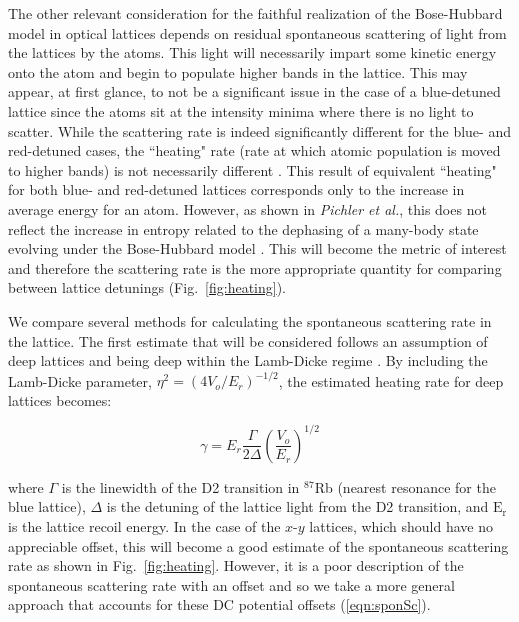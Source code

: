 
The other relevant consideration for the faithful realization of the Bose-Hubbard model in optical lattices depends on residual spontaneous scattering of light from the lattices by the atoms. This light will necessarily impart some kinetic energy onto the atom and begin to populate higher bands in the lattice. This may appear, at first glance, to not be a significant issue in the case of a blue-detuned lattice since the atoms sit at the intensity minima where there is no light to scatter. While the scattering rate is indeed significantly different for the blue- and red-detuned cases, the ``heating" rate (rate at which atomic population is moved to higher bands) is not necessarily different \cite{Pichler2010}. This result of equivalent ``heating" for both blue- and red-detuned lattices corresponds only to the increase in average energy for an atom. However, as shown in \emph{Pichler et al.}, this does not reflect the increase in entropy related to the dephasing of a many-body state evolving under the Bose-Hubbard model \cite{Pichler2010}. This will become the metric of interest and therefore the scattering rate is the more appropriate quantity for comparing between lattice detunings (Fig.~\ref{fig:heating}).

We compare several methods for calculating the spontaneous scattering rate in the lattice. The first estimate that will be considered follows an assumption of deep lattices and being deep within the Lamb-Dicke regime \cite{Grimm2000, Pichler2010}. By including the Lamb-Dicke parameter, $\eta^2=(4V_o/E_r)^{-1/2}$, the estimated heating rate for deep lattices becomes:

\begin{equation}
\gamma=E_r \frac{\Gamma}{2 \Delta} \left ( \frac{V_o}{E_r} \right )^{1/2}
\label{eqn:lambDickeEst}
\end{equation}

where $\Gamma$ is the linewidth of the D2 transition in $^{87}$Rb (nearest resonance for the blue lattice), $\Delta$ is the detuning of the lattice light from the D2 transition, and $\mathrm{E_r}$ is the lattice recoil energy. In the case of the $x$-$y$ lattices, which should have no appreciable offset, this will become a good estimate of the spontaneous scattering rate as shown in Fig.~\ref{fig:heating}. However, it is a poor description of the spontaneous scattering rate with an offset and so we take a more general approach that accounts for these DC potential offsets (\ref{eqn:sponSc}).

